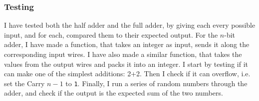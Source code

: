 \subsubsection*{Testing}
I have tested both the half adder and the full adder, by giving each every
possible input, and for each, compared them to their expected output. For the
$n$-bit adder, I have made a function, that takes an integer as input, sends it
along the corresponding input wires. I have also made a similar function, that
takes the values from the output wires and packs it into an integer. I start by
testing if it can make one of the simplest additions: 2+2. Then I check if it
can overflow, i.e. set the Carry $n-1$ to \texttt{1}. Finally, I run a series
of random numbers through the adder, and check if the output is the expected
sum of the two numbers.
